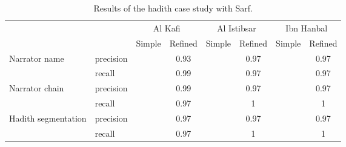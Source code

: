 \begin{table}
\begin{minipage}{\textwidth}
 {    
    \begin{tabular}{llcccccc}
\hline \hline
          &       & \multicolumn{2}{c}{Al Kafi} & \multicolumn{2}{c}{Al Istibsar} & \multicolumn{2}{c}{Ibn Hanbal} \\
\cline{3-8}
          &       & Simple & Refined & Simple & Refined & Simple & Refined \\ \hline
    \multicolumn{1}{l}{\multirow{2}[0]{*}{Narrator name}} & precision &       & 0.93  &       & 0.97  &       & 0.97 \\
    \multicolumn{1}{l}{} & recall &       & 0.99  &       & 0.97  &       & 0.97 \\
    \multicolumn{1}{l}{\multirow{2}[0]{*}{Narrator chain}} & precision &       & 0.99  &       & 0.97  &       & 0.97 \\
    \multicolumn{1}{l}{} & recall &       & 0.97  &       & 1     &       & 1 \\
    \multicolumn{1}{l}{\multirow{2}[0]{*}{Hadith segmentation}} & precision &       & 0.97  &       & 0.97  &       & 0.97 \\
    \multicolumn{1}{l}{} & recall &       & 0.97  &       & 1     &       & 1 \\
    \hline \hline
\end{tabular}%
}
\end{minipage}
  \caption{Results of the hadith case study with Sarf.}
  \label{t:exp2Res}%
\end{table}%

